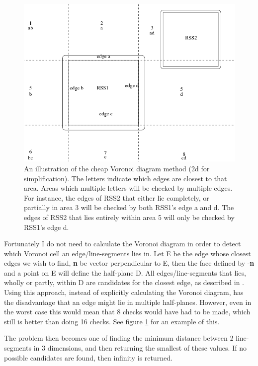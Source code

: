 \begin{figure}
\centering
\includegraphics[width=\textwidth]{figures/vorCheap}
\caption{\label{vor-cheap}An illustration of the cheap Voronoi diagram method (2d for simplification). The letters indicate which edges are closest to that area. Areas which multiple letters will be checked by multiple edges. For instance, the edges of RSS2 that either lie completely, or partially in area 3 will be checked by both RSS1's edge a and d. The edges of RSS2 that lies entirely within area 5 will only be checked by RSS1's edge d.}
\end{figure}

Fortunately I do not need to calculate the Voronoi diagram in order to detect which Voronoi cell an edge/line-segments lies in. Let E be the edge whose closest edges we wish to find, \textbf{n} be vector perpendicular to E, then the face defined by -\textbf{n} and a point on E will define the half-plane D. All edges/line-segments that lies, wholly or partly, within D are candidates for the closest edge, as described in \cite{larsen00fast}. Using this approach, instead of explicitly calculating the Voronoi diagram, has the disadvantage that an edge might lie in multiple half-planes. However, even in the worst case this would mean that 8 checks would have had to be made, which still is better than doing 16 checks. See figure \ref{vor-cheap} for an example of this.

The problem then becomes one of finding the minimum distance between 2 line-segments in 3 dimensions, and then returning the smallest of these values. If no possible candidates are found, then infinity is returned.

